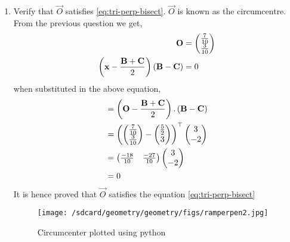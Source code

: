 \documentclass[11pt]{book}
\begin{document}
\begin{enumerate}[label=\thesection.\arabic*.,ref=\thesection.\theenumi]
\item Verify that $\vec{O}$ satisfies
			\eqref{eq:tri-perp-bisect}.
$\vec{O}$ is known as the circumcentre.\\
 \solution
 From the previous question we get,
 \begin{align}
\mathbf{O}&=\begin{pmatrix}\frac{7}{10}\\ \frac{3}{10}\end{pmatrix} \\
\left(\mathbf{x}-\frac{\mathbf{B}+\mathbf{C}}{2}\right)\left(\mathbf{B}-\mathbf{C}\right) &= 0
\end{align}
when substituted in the above equation,
\begin{align}
	&=\left(\mathbf{O}-\frac{\mathbf{B}+\mathbf{C}}{2}\right).\left(\mathbf{B}-\mathbf{C}\right)\\
	&=\left(\begin{pmatrix}\frac{7}{10}\\ \frac{3}{10}\end{pmatrix}- \begin{pmatrix}\frac{5}{2}\\3\end{pmatrix}\right)^{\top} \begin{pmatrix}3\\-2\end{pmatrix}\\
	&=\begin{pmatrix}\frac{-18}{10}& \frac{-27}{10}\end{pmatrix}\begin{pmatrix}3\\-2\end{pmatrix}\\
	&=0
\end{align}
It is hence proved that $\vec{O}$ satisfies the equation \eqref{eq:tri-perp-bisect}
\begin{figure}[H]
\centering
\texttt{[image: /sdcard/geometry/geometry/figs/ramperpen2.jpg]}
\caption{Circumcenter plotted using python}
\label{fig:Circumcenter to BC}
\end{figure}


\end{enumerate}
\end{document}
